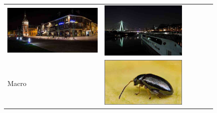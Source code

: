 \begin{figure}
\begin{tabular}{m{.01\linewidth} m{.16\linewidth} m{.16\linewidth} m{.16\linewidth} m{.16\linewidth} m{.16\linewidth}}
    \includegraphics[width=\linewidth]{../style/figures/flickr_on_flickr/pred_style_Long_Exposure/3.jpg} &
    \includegraphics[width=\linewidth]{../style/figures/flickr_on_flickr/pred_style_Long_Exposure/4.jpg} \\
    \begin{turn}{90}{Macro}\end{turn} &
    \includegraphics[width=\linewidth]{../style/figures/flickr_on_flickr/pred_style_Macro/0.jpg} &

\end{tabular}
\end{figure}
